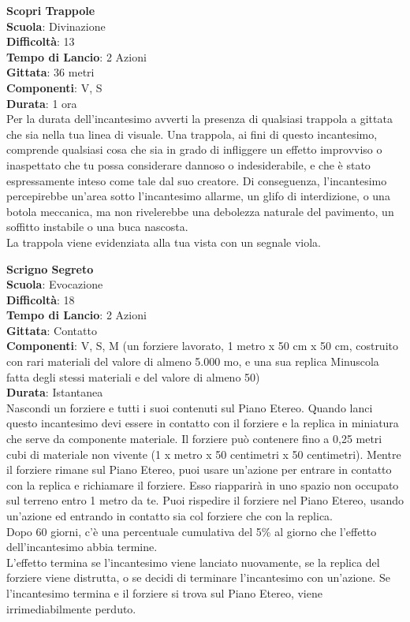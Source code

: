 \begin{multicols}{2}
\medskip\textbf{Scopri Trappole}\\
\textbf{Scuola}: Divinazione\\
\textbf{Difficoltà}: 13\\
\textbf{Tempo di Lancio}: 2 Azioni\\
\textbf{Gittata}: 36 metri\\
\textbf{Componenti}: V, S\\
\textbf{Durata}: 1 ora\\
Per la durata dell'incantesimo avverti la presenza di qualsiasi trappola a gittata che sia nella tua linea di visuale. Una trappola, ai fini di questo incantesimo, comprende qualsiasi cosa che sia in grado di infliggere un effetto improvviso o inaspettato che tu possa considerare dannoso o indesiderabile, e che è stato espressamente inteso come tale dal suo creatore. Di conseguenza, l'incantesimo percepirebbe un'area sotto l'incantesimo allarme, un glifo di interdizione, o una botola meccanica, ma non rivelerebbe una debolezza naturale del pavimento, un soffitto instabile o una buca nascosta.\\
La trappola viene evidenziata alla tua vista con un segnale viola.

\medskip\textbf{Scrigno Segreto}\\
\textbf{Scuola}: Evocazione\\
\textbf{Difficoltà}: 18\\
\textbf{Tempo di Lancio}: 2 Azioni\\
\textbf{Gittata}: Contatto\\
\textbf{Componenti}: V, S, M (un forziere lavorato, 1 metro x 50 cm x 50 cm, costruito con rari materiali del valore di almeno 5.000 mo, e una sua replica Minuscola fatta degli stessi materiali e del valore di almeno 50) \\
\textbf{Durata}: Istantanea\\
Nascondi un forziere e tutti i suoi contenuti sul Piano Etereo. Quando lanci questo incantesimo devi essere in contatto con il forziere e la replica in miniatura che serve da componente materiale. Il forziere può contenere fino a 0,25 metri cubi di materiale non vivente (1 x metro x 50 centimetri x 50 centimetri). Mentre il forziere rimane sul Piano Etereo, puoi usare un'azione per entrare in contatto con la replica e richiamare il forziere. Esso riapparirà in uno spazio non occupato sul terreno entro 1 metro da te. Puoi rispedire il forziere nel Piano Etereo, usando un'azione ed entrando in contatto sia col forziere che con la replica.\\
Dopo 60 giorni, c'è una percentuale cumulativa del 5\% al giorno che l'effetto dell'incantesimo abbia termine. \\
L'effetto termina se l'incantesimo viene lanciato nuovamente, se la replica del forziere viene distrutta, o se decidi di terminare l'incantesimo con un'azione. Se l'incantesimo termina e il forziere si trova sul Piano Etereo, viene irrimediabilmente perduto.


\end{multicols}
